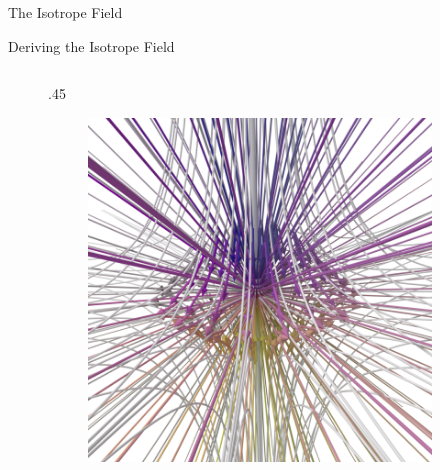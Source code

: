 \documentclass[final]{beamer}
\newlength{\onecolwid}
\begin{document}
\begin{frame}[t]
\begin{columns}[t]
\begin{column}{\onecolwid}
\begin{block}{\huge{The Isotrope Field}}
\begin{block}{Deriving the Isotrope Field}
\begin{figure}
\begin{columns}[t,totalwidth=\onecolwid]
\begin{column}{.45\onecolwid}
\begin{centering}
\begin{figure}
        \includegraphics[width=.45\onecolwid]{fig/nulltropesneg.png}
        \end{figure}
        \end{centering}
    \end{column}


\end{columns}
\end{figure}
\end{block}
\end{block}
\end{column}
\end{columns}
\end{frame}
\end{document}
